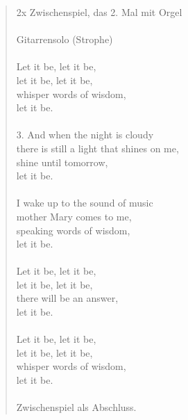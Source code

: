 \documentclass[10pt]{article}
\begin{document}
\begin{verse}
    2x Zwischenspiel, das 2. Mal mit Orgel \\
    ~\\

    Gitarrensolo (Strophe) \\
    ~\\

    Let it be, let it be, \\
    let it be, let it be, \\
    whisper words of wisdom, \\
    let it be. \\
    ~\\


    3. And when the night is cloudy \\
    there is still a light that shines on me, \\
    shine until tomorrow, \\
    let it be. \\
    ~\\

    I wake up to the sound of music \\
    mother Mary comes to me, \\
    speaking words of wisdom, \\
    let it be. \\
    ~\\


    Let it be, let it be, \\
    let it be, let it be, \\
    there will be an answer, \\
    let it be. \\
    ~\\

    Let it be, let it be, \\
    let it be, let it be, \\
    whisper words of wisdom, \\
    let it be. \\
    ~\\

    Zwischenspiel als Abschluss. \\

\end{verse}
\end{document}
